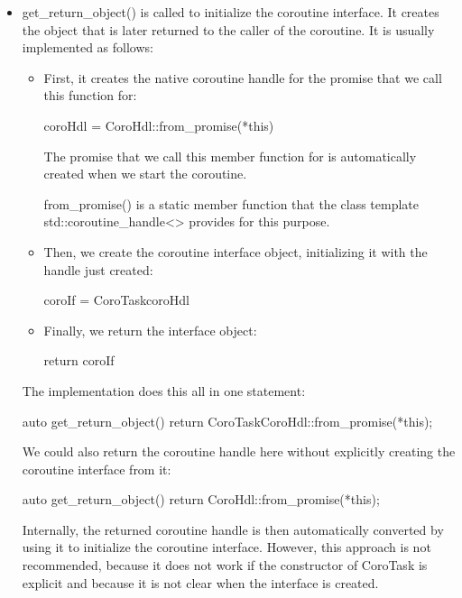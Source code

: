 \begin{itemize}
\item 
get\_return\_object() is called to initialize the coroutine interface. It creates the object that is later returned to the caller of the coroutine. It is usually implemented as follows:
\begin{itemize}
\item 
First, it creates the native coroutine handle for the promise that we call this function for:

\begin{cpp}
coroHdl = CoroHdl::from_promise(*this)
\end{cpp}

The promise that we call this member function for is automatically created when we start the coroutine.

from\_promise() is a static member function that the class template std::coroutine\_handle<> provides for this purpose.

\item 
Then, we create the coroutine interface object, initializing it with the handle just created:

\begin{cpp}
coroIf = CoroTask{coroHdl}
\end{cpp}


\item 
Finally, we return the interface object:

\begin{cpp}
return coroIf
\end{cpp}

\end{itemize}

The implementation does this all in one statement:

\begin{cpp}
auto get_return_object() {
	return CoroTask{CoroHdl::from_promise(*this)};
}
\end{cpp}

We could also return the coroutine handle here without explicitly creating the coroutine interface from it:

\begin{cpp}
auto get_return_object() {
	return CoroHdl::from_promise(*this);
}
\end{cpp}

Internally, the returned coroutine handle is then automatically converted by using it to initialize the coroutine interface. However, this approach is not recommended, because it does not work if the constructor of CoroTask is explicit and because it is not clear when the interface is created.


\end{itemize}
